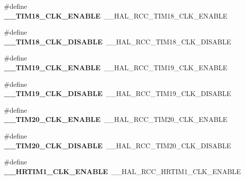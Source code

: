 \begin{DoxyCompactItemize}
\item 
\mbox{\label{group___h_a_l___r_c_c___aliased_ga299d99f2c8deaffbee002dd70a5c8f15}} 
\#define {\bfseries \+\_\+\+\_\+\+T\+I\+M18\+\_\+\+C\+L\+K\+\_\+\+E\+N\+A\+B\+LE}~\+\_\+\+\_\+\+H\+A\+L\+\_\+\+R\+C\+C\+\_\+\+T\+I\+M18\+\_\+\+C\+L\+K\+\_\+\+E\+N\+A\+B\+LE
\item 
\mbox{\label{group___h_a_l___r_c_c___aliased_gad29b4581580af1d318589d2c0403f4ab}} 
\#define {\bfseries \+\_\+\+\_\+\+T\+I\+M18\+\_\+\+C\+L\+K\+\_\+\+D\+I\+S\+A\+B\+LE}~\+\_\+\+\_\+\+H\+A\+L\+\_\+\+R\+C\+C\+\_\+\+T\+I\+M18\+\_\+\+C\+L\+K\+\_\+\+D\+I\+S\+A\+B\+LE
\item 
\mbox{\label{group___h_a_l___r_c_c___aliased_ga6e908d1b2908430d1ed2af109dd81d31}} 
\#define {\bfseries \+\_\+\+\_\+\+T\+I\+M19\+\_\+\+C\+L\+K\+\_\+\+E\+N\+A\+B\+LE}~\+\_\+\+\_\+\+H\+A\+L\+\_\+\+R\+C\+C\+\_\+\+T\+I\+M19\+\_\+\+C\+L\+K\+\_\+\+E\+N\+A\+B\+LE
\item 
\mbox{\label{group___h_a_l___r_c_c___aliased_ga3b32538dedb67006d1b9c9aa210ed5f3}} 
\#define {\bfseries \+\_\+\+\_\+\+T\+I\+M19\+\_\+\+C\+L\+K\+\_\+\+D\+I\+S\+A\+B\+LE}~\+\_\+\+\_\+\+H\+A\+L\+\_\+\+R\+C\+C\+\_\+\+T\+I\+M19\+\_\+\+C\+L\+K\+\_\+\+D\+I\+S\+A\+B\+LE
\item 
\mbox{\label{group___h_a_l___r_c_c___aliased_ga1be7819837c9d5ce89b5006858aa2c78}} 
\#define {\bfseries \+\_\+\+\_\+\+T\+I\+M20\+\_\+\+C\+L\+K\+\_\+\+E\+N\+A\+B\+LE}~\+\_\+\+\_\+\+H\+A\+L\+\_\+\+R\+C\+C\+\_\+\+T\+I\+M20\+\_\+\+C\+L\+K\+\_\+\+E\+N\+A\+B\+LE
\item 
\mbox{\label{group___h_a_l___r_c_c___aliased_gac795b2f6f86b1444869608b8cdd2ded5}} 
\#define {\bfseries \+\_\+\+\_\+\+T\+I\+M20\+\_\+\+C\+L\+K\+\_\+\+D\+I\+S\+A\+B\+LE}~\+\_\+\+\_\+\+H\+A\+L\+\_\+\+R\+C\+C\+\_\+\+T\+I\+M20\+\_\+\+C\+L\+K\+\_\+\+D\+I\+S\+A\+B\+LE
\item 
\mbox{\label{group___h_a_l___r_c_c___aliased_gaa8ef9aa8aac2736d3795d30295bef523}} 
\#define {\bfseries \+\_\+\+\_\+\+H\+R\+T\+I\+M1\+\_\+\+C\+L\+K\+\_\+\+E\+N\+A\+B\+LE}~\+\_\+\+\_\+\+H\+A\+L\+\_\+\+R\+C\+C\+\_\+\+H\+R\+T\+I\+M1\+\_\+\+C\+L\+K\+\_\+\+E\+N\+A\+B\+LE

\end{DoxyCompactItemize}
